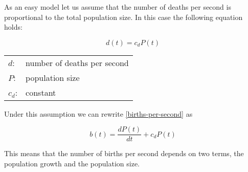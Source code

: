 As an easy model let us assume that the number of deaths
per second is proportional to the total population size.
In this case the following equation holds:

\begin{equation}
d(t) = c_{d} P(t)
\end{equation}

\begin{tabular}{ll}
$d$:     & number of deaths per second\\
$P$:     & population size\\
$c_{d}$: & constant
\end{tabular}
\vspace{1em}

Under this assumption we can rewrite \ref{births-per-second}
as

\begin{equation}
b(t) = \frac{dP(t)}{dt} + c_{d} P(t)
\end{equation}

This means that the number of births per second depends on
two terms, the population growth and the population size.










